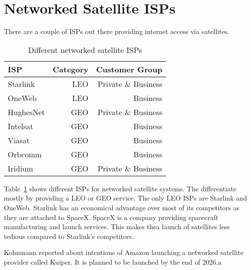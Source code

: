 \section{Networked Satellite ISPs} \label{sec>isps}

There are a couple of ISPs out there providing internet access via satellites.

\begin{table}[]
	\caption{Different networked satellite ISPs}
	\label{fig:satellite-isp}
	\begin{tabular}{lrr}
		\toprule
		ISP       & Category & Customer Group      \\
		\midrule
		Starlink  & LEO      & Private \& Business \\
		OneWeb    & LEO      & Business            \\
		HughesNet & GEO      & Private \& Business \\
		Intelsat  & GEO      & Business            \\
		Viasat    & GEO      & Business            \\
		Orbcomm   & GEO      & Business            \\
		Iridium   & GEO      & Private \& Business \\
		\bottomrule
	\end{tabular}
\end{table}

Table~\ref{fig:satellite-isp} shows different ISPs for networked satellite
systems. The differentiate mostly by providing a \ac{LEO} or \ac{GEO} service.
The only \ac{LEO} ISPs are Starlink and OneWeb. Starlink has an economical
advantage over most of its competitors as they are attached to SpaceX. SpaceX
is a company providing spacecraft manufacturing and launch services. This makes
thea launch of satellites less tedious compared to Starlink's competitors.

Kohnmann \cite{Kohnmann24} reported about intentions of Amazon launching a
networked satellite provider called Kuiper. It is planned to be launched by the
end of 2026.a
